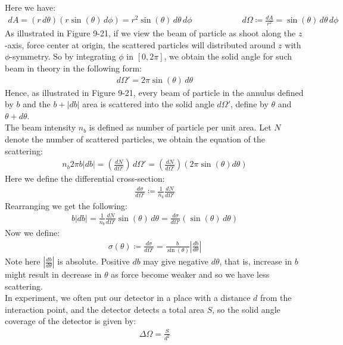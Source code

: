 \documentclass[11pt,oneside]{book}
\theoremstyle{break}
\theoremstyle{break}
\begin{document}
Here we have:
\begin{align*}
dA = (r\,d\theta)(r\sin(\theta)\, d\phi) = r^2 \sin(\theta) \,d\theta\, d\phi \qquad\qquad\qquad  d\Omega \coloneqq \frac{dA}{r^2} = \sin(\theta) \,d\theta\, d\phi
\end{align*}
As illustrated in Figure 9-21, if we view the beam of particle as shoot along the $z$-axis, force center at origin, the scattered particles will distributed around $z$ with $\phi$-symmetry. So by integrating $\phi$ in $[0,2\pi]$, we obtain the solid angle for such beam in theory in the following form:
\begin{align*}
d\Omega' = 2\pi \sin(\theta) \,d\theta
\end{align*}
Hence, as illustrated in Figure 9-21, every  beam of particle in the annulus defined by $b$ and the $b+|db|$ area is scattered into the solid angle $d\Omega'$, define by $\theta$ and $\theta+d\theta$. \\

The beam intensity $n_b$ is defined as number of particle per unit area. Let $N$ denote the number of scattered particles, we obtain the equation of the scattering:
\begin{align*}
n_b 2\pi b |db| = \left(\frac{dN}{d\Omega'} \right)\, d\Omega' = \left( \frac{dN}{d\Omega'}\right) (2\pi \sin(\theta) d\theta)
\end{align*}
Here we define the differential cross-section:
\begin{align*}
\frac{d\sigma}{d\Omega'} \coloneqq \frac{1}{n_b}\frac{dN}{d\Omega'}
\end{align*}
Rearranging we get the following:
\begin{align*}
b|db| = \frac{1}{n_b} \frac{dN}{d\Omega'} \sin(\theta)\,d\theta = \frac{d\sigma}{d\Omega'} (\sin(\theta) \, d\theta)
\end{align*}
Now we define:
\begin{align*}
\sigma(\theta) \coloneqq \frac{d\sigma}{d\Omega'}  = \frac{b}{\sin(\theta)}\left| \frac{db}{d\theta}\right|
\end{align*}
Note here $|\frac{db}{d\theta}|$ is absolute. Positive $db$ may give negative $d\theta$, that is, increase in $b$ might result in decrease in $\theta$ as force become weaker and so we have less scattering. \\

In experiment, we often put our detector in a place with a distance $d$ from the interaction point, and the detector detects a total area $S$, so the solid angle coverage of the detector is given by:
\begin{align*}
\Delta \Omega = \frac{S}{d^2}
\end{align*}
\end{document}
